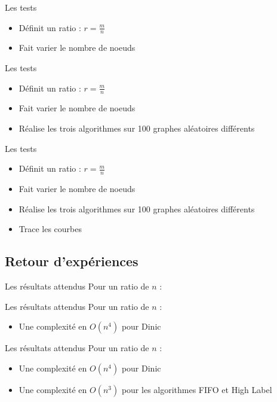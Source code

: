 \documentclass[hyperref={},
xcolor={dvipsnames,svgnames,table},10pt]{beamer}
\begin{document}
\begin{frame}{Les tests}
	\begin{itemize}
		\item Définit un ratio : $r = \frac{m}{n}$
		\item Fait varier le nombre de noeuds
	\end{itemize}
\end{frame}
\begin{frame}{Les tests}
	\begin{itemize}
		\item Définit un ratio : $r = \frac{m}{n}$
		\item Fait varier le nombre de noeuds
		\item Réalise les trois algorithmes sur 100 graphes aléatoires différents
	\end{itemize}
\end{frame}
\begin{frame}{Les tests}
	\begin{itemize}
		\item Définit un ratio : $r = \frac{m}{n}$
		\item Fait varier le nombre de noeuds
		\item Réalise les trois algorithmes sur 100 graphes aléatoires différents
		\item Trace les courbes
	\end{itemize}
\end{frame}

\subsection{Retour d'expériences}

\begin{frame}{Les résultats attendus}
	Pour un ratio de $n$ : 
\end{frame}

\begin{frame}{Les résultats attendus}
	Pour un ratio de $n$ : \begin{itemize}
		\item Une complexité en $O(n^4)$ pour Dinic
	\end{itemize}
\end{frame}

\begin{frame}{Les résultats attendus}
	Pour un ratio de $n$ : \begin{itemize}
		\item Une complexité en $O(n^4)$ pour Dinic
		\item Une complexité en $O(n^3)$ pour les algorithmes FIFO et High Label
	\end{itemize}
\end{frame}
\end{document}
